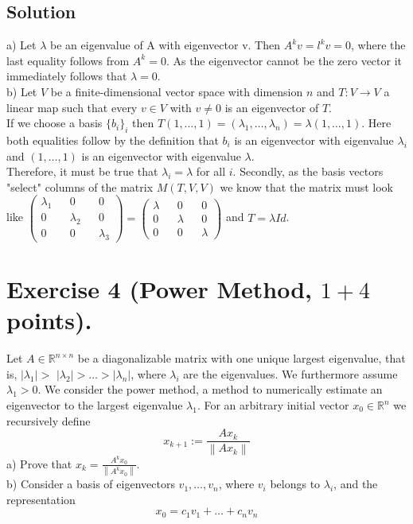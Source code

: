 \documentclass[10pt]{article}
\numberwithin{equation}{section}
\begin{document}
\subsection{Solution}
a) Let $\lambda$ be an eigenvalue of A with eigenvector v. Then $A^kv = l^k v=0$, where the last equality follows from $A^k = 0$. As the eigenvector cannot be the zero vector it immediately follows that $\lambda=0$.\\
b) Let $V$ be a finite-dimensional vector space with dimension $n$ and $T: V \rightarrow V$ a linear map such that every $v \in V$ with $v \neq 0$ is an eigenvector of $T$. \\
If we choose a basis $\{b_i\}_i$ then $T(1,\ldots, 1)= (\lambda_1, \ldots, \lambda_n)= \lambda (1, \dots, 1)$. Here both equalities follow by the definition that $b_i$ is an eigenvector with eigenvalue $\lambda_i$ and $(1, \dots, 1)$ is an eigenvector with eigenvalue $\lambda$. \\
Therefore, it must be true that $\lambda_i = \lambda$ for all $i$. Secondly, as the basis vectors "select" columns of the matrix $M(T, V, V)$ we know that the matrix must look like $\begin{pmatrix} \lambda_1 && 0 && 0 \\ 0 && \lambda_2 && 0 \\ 0 && 0 && \lambda_3 \end{pmatrix} = \begin{pmatrix} \lambda && 0 && 0 \\ 0 && \lambda && 0 \\ 0 && 0 && \lambda \end{pmatrix}$ and $T = \lambda Id$. 
\section{Exercise 4 (Power Method, $1+4$ points).}
Let $A \in \mathbb{R}^{n \times n}$ be a diagonalizable matrix with one unique largest eigenvalue, that is, $\left|\lambda_1\right|>$ $\left|\lambda_2\right|>\ldots>\left|\lambda_n\right|$, where $\lambda_i$ are the eigenvalues. We furthermore assume $\lambda_1>0$.
We consider the power method, a method to numerically estimate an eigenvector to the largest eigenvalue $\lambda_1$. For an arbitrary initial vector $x_0 \in \mathbb{R}^n$ we recursively define
$$
x_{k+1}:=\frac{A x_k}{\left\|A x_k\right\|}
$$
a) Prove that $x_k=\frac{A^k x_0}{\left\|A^k x_0\right\|}$.\\
b) Consider a basis of eigenvectors $v_1, \ldots, v_n$, where $v_i$ belongs to $\lambda_i$, and the representation
$$
x_0=c_1 v_1+\ldots+c_n v_n
$$
\end{document}
